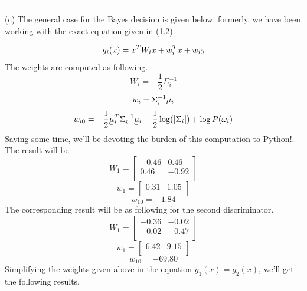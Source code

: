 \documentclass[12pt]{article}
\numberwithin{equation}{section}
\numberwithin{table}{section}
\numberwithin{figure}{section}
\begin{document}
\noindent\rule{\textwidth}{.5pt}
(c) The general case for the Bayes decision is given below. formerly, we have been working with the exact equation given in (1.2).

\begin{equation}
	g_i(\underaccent{\bar}{x}) = \underaccent{\bar}{x}^TW_i\underaccent{\bar}{x} + w_i^T\underaccent{\bar}{x} + w_{i0}
\end{equation}
The weights are computed as following.
$$
	W_i = -\frac{1}{2}\Sigma_i^{-1}
$$
$$
	w_i = \Sigma_i^{-1}\underaccent{\bar}{\mu}_i
$$
$$
	w_{i0} = -\frac{1}{2}\underaccent{\bar}{\mu}_i^T\Sigma_i^{-1}\underaccent{\bar}{\mu}_i - \frac{1}{2}\log(|\Sigma_i|) + \log P(\omega_i)
$$
Saving some time, we'll be devoting the burden of this computation to Python!. The result will be:
$$
	W_1 =  \begin{bmatrix}
	-0.46 & 0.46\\
	0.46 & -0.92\\
	\end{bmatrix}
$$
$$
	w_1 = \begin{bmatrix}
	0.31 & 1.05\\
	\end{bmatrix}
$$
$$
	w_{10} = -1.84
$$
The corresponding result will be as following for the second discriminator.
$$
	W_1 =  \begin{bmatrix}
	-0.36 & -0.02\\
	-0.02 & -0.47\\
	\end{bmatrix}
$$
$$
	w_1 = \begin{bmatrix}
	6.42 & 9.15\\
	\end{bmatrix}
$$
$$
	w_{10} = -69.80
$$
Simplifying the weights given above in the equation $g_1(x) = g_2(x)$, we'll get the following results.
$$
	
\end{document}
